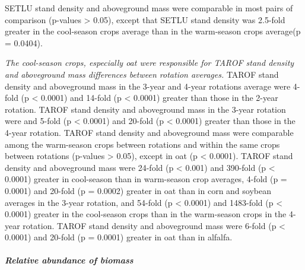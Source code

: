 \documentclass[
]{article}
\begin{document}
SETLU stand density and aboveground mass were comparable in most pairs of comparison (p-values \textgreater{} 0.05), except that SETLU stand density was 2.5-fold greater in the cool-season crops average than in the warm-season crops average(p = 0.0404).

\emph{The cool-season crops, especially oat were responsible for TAROF stand density and aboveground mass differences between rotation averages.} TAROF stand density and aboveground mass in the 3-year and 4-year rotations average were 4-fold (p \textless{} 0.0001) and 14-fold (p \textless{} 0.0001) greater than those in the 2-year rotation. TAROF stand density and aboveground mass in the 3-year rotation were and 5-fold (p \textless{} 0.0001) and 20-fold (p \textless{} 0.0001) greater than those in the 4-year rotation. TAROF stand density and aboveground mass were comparable among the warm-season crops between rotations and within the same crops between rotations (p-values \textgreater{} 0.05), except in oat (p \textless{} 0.0001). TAROF stand density and aboveground mass were 24-fold (p \textless{} 0.001) and 390-fold (p \textless{} 0.0001) greater in cool-season than in warm-season crop averages, 4-fold (p = 0.0001) and 20-fold (p = 0.0002) greater in oat than in corn and soybean averages in the 3-year rotation, and 54-fold (p \textless{} 0.0001) and 1483-fold (p \textless{} 0.0001) greater in the cool-season crops than in the warm-season crops in the 4-year rotation. TAROF stand density and aboveground mass were 6-fold (p \textless{} 0.0001) and 20-fold (p = 0.0001) greater in oat than in alfalfa.

\subparagraph{Relative abundance of biomass}\label{relative-abundance-of-biomass}
\end{document}
